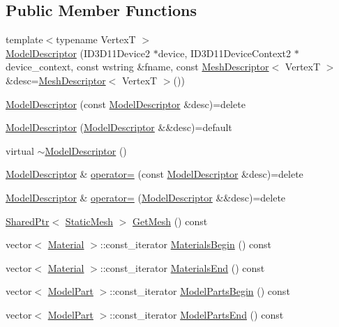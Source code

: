 \subsection*{Public Member Functions}
\begin{DoxyCompactItemize}
\item 
{\footnotesize template$<$typename VertexT $>$ }\\\hyperlink{classmage_1_1_model_descriptor_a1ae1d85907be96350cef77e6a4ba4fb9}{Model\+Descriptor} (I\+D3\+D11\+Device2 $\ast$device, I\+D3\+D11\+Device\+Context2 $\ast$device\+\_\+context, const wstring \&fname, const \hyperlink{structmage_1_1_mesh_descriptor}{Mesh\+Descriptor}$<$ VertexT $>$ \&desc=\hyperlink{structmage_1_1_mesh_descriptor}{Mesh\+Descriptor}$<$ VertexT $>$())
\item 
\hyperlink{classmage_1_1_model_descriptor_af44185efc20e10ede762d29bc454c5f3}{Model\+Descriptor} (const \hyperlink{classmage_1_1_model_descriptor}{Model\+Descriptor} \&desc)=delete
\item 
\hyperlink{classmage_1_1_model_descriptor_af9be9f46bc8f42fa04f686af6cc296f6}{Model\+Descriptor} (\hyperlink{classmage_1_1_model_descriptor}{Model\+Descriptor} \&\&desc)=default
\item 
virtual \hyperlink{classmage_1_1_model_descriptor_a3bc8ee3d1cb8d2675374727edce3d593}{$\sim$\+Model\+Descriptor} ()
\item 
\hyperlink{classmage_1_1_model_descriptor}{Model\+Descriptor} \& \hyperlink{classmage_1_1_model_descriptor_a734b17224719896921e9f6252ee88483}{operator=} (const \hyperlink{classmage_1_1_model_descriptor}{Model\+Descriptor} \&desc)=delete
\item 
\hyperlink{classmage_1_1_model_descriptor}{Model\+Descriptor} \& \hyperlink{classmage_1_1_model_descriptor_ae2ae685569c0ae534d9f0b5622a807d0}{operator=} (\hyperlink{classmage_1_1_model_descriptor}{Model\+Descriptor} \&\&desc)=delete
\item 
\hyperlink{namespacemage_a1e01ae66713838a7a67d30e44c67703e}{Shared\+Ptr}$<$ \hyperlink{classmage_1_1_static_mesh}{Static\+Mesh} $>$ \hyperlink{classmage_1_1_model_descriptor_a0781eed81d27ed936503056bbd46ab58}{Get\+Mesh} () const
\item 
vector$<$ \hyperlink{structmage_1_1_material}{Material} $>$\+::const\+\_\+iterator \hyperlink{classmage_1_1_model_descriptor_a64a2ca531c03cd8d79eda3a728e6efa1}{Materials\+Begin} () const
\item 
vector$<$ \hyperlink{structmage_1_1_material}{Material} $>$\+::const\+\_\+iterator \hyperlink{classmage_1_1_model_descriptor_a3e1880190d58d4d1bc308766f804047d}{Materials\+End} () const
\item 
vector$<$ \hyperlink{structmage_1_1_model_part}{Model\+Part} $>$\+::const\+\_\+iterator \hyperlink{classmage_1_1_model_descriptor_a721a81fae1d5613af8a3a037577ce454}{Model\+Parts\+Begin} () const
\item 
vector$<$ \hyperlink{structmage_1_1_model_part}{Model\+Part} $>$\+::const\+\_\+iterator \hyperlink{classmage_1_1_model_descriptor_a97f78d3e5a157020f62f5e6003deaac6}{Model\+Parts\+End} () const
\end{DoxyCompactItemize}
